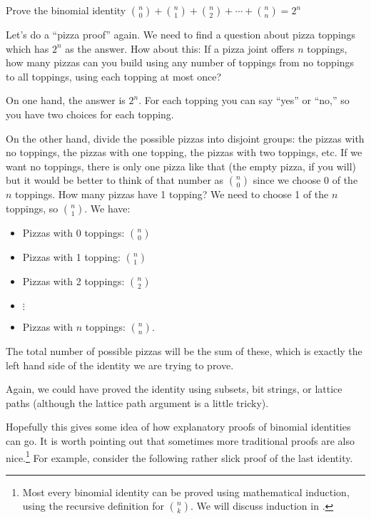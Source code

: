 \documentclass[12pt]{article}
\begin{document}
\begin{example}
  Prove the binomial identity ${n\choose 0} + {n \choose 1} + {n\choose 2} + \cdots + {n \choose n} = 2^n$
  \begin{solution}
    Let's do a ``pizza proof'' again.  We need to find a question about pizza toppings which has $2^n$ as the answer.  How about this: If a pizza joint offers $n$ toppings, how many pizzas can you build using any number of toppings from no toppings to all toppings, using each topping at most once?
    
    On one hand, the answer is $2^n$.  For each topping you can say ``yes'' or ``no,'' so you have two choices for each topping.
    
    On the other hand, divide the possible pizzas into disjoint groups: the pizzas with no toppings, the pizzas with one topping, the pizzas with two toppings, etc.  If we want no toppings, there is only one pizza like that (the empty pizza, if you will) but it would be better to think of that number as ${n \choose 0}$ since we choose 0 of the $n$ toppings.  How many pizzas have 1 topping?  We need to choose 1 of the $n$ toppings, so ${n \choose 1}$.  We have:
    \begin{itemize}
      \item[] Pizzas with 0 toppings: ${n \choose 0}$
      \item[] Pizzas with 1 topping: ${n \choose 1}$
      \item[] Pizzas with 2 toppings: ${n \choose 2}$
      \item[] \qquad $\vdots$
      \item[] Pizzas with $n$ toppings: ${n \choose n}$.
    \end{itemize}
    The total number of possible pizzas will be the sum of these, which is exactly the left hand side of the identity we are trying to prove.  
    
    Again, we could have proved the identity using subsets, bit strings, or lattice paths (although the lattice path argument is a little tricky). 
  \end{solution}

\end{example}

Hopefully this gives some idea of how explanatory proofs of binomial identities can go.  It is worth pointing out that sometimes more traditional proofs are also nice.\footnote{Most every binomial identity can be proved using mathematical induction, using the recursive definition for ${n \choose k}$.  We will discuss induction in .}  For example, consider the following rather slick proof of the last identity.
\end{document}
